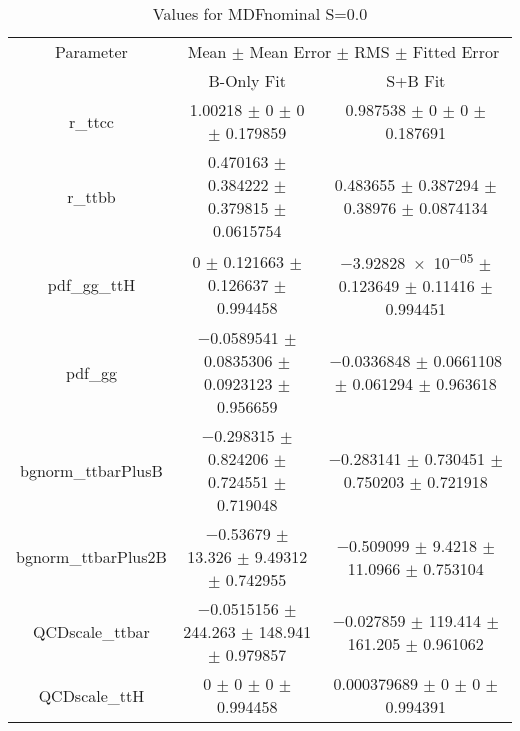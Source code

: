 \begin{table}
\centering
\caption{Values for MDFnominal S=0.0}
\begin{tabular}{ccc}
\toprule
Parameter & \multicolumn{2}{c}{Mean $\pm$ Mean Error $\pm$ RMS $\pm$ Fitted Error}\\
 & B-Only Fit & S+B Fit\\
\midrule
r\_ttcc & \num{1.00218} $\pm$ \num{0} $\pm$ \num{0} $\pm$ \num{0.179859} & \num{0.987538} $\pm$ \num{0} $\pm$ \num{0} $\pm$ \num{0.187691}\\
r\_ttbb & \num{0.470163} $\pm$ \num{0.384222} $\pm$ \num{0.379815} $\pm$ \num{0.0615754} & \num{0.483655} $\pm$ \num{0.387294} $\pm$ \num{0.38976} $\pm$ \num{0.0874134}\\
pdf\_gg\_ttH & \num{0} $\pm$ \num{0.121663} $\pm$ \num{0.126637} $\pm$ \num{0.994458} & \num{-3.92828e-05} $\pm$ \num{0.123649} $\pm$ \num{0.11416} $\pm$ \num{0.994451}\\
pdf\_gg & \num{-0.0589541} $\pm$ \num{0.0835306} $\pm$ \num{0.0923123} $\pm$ \num{0.956659} & \num{-0.0336848} $\pm$ \num{0.0661108} $\pm$ \num{0.061294} $\pm$ \num{0.963618}\\
bgnorm\_ttbarPlusB & \num{-0.298315} $\pm$ \num{0.824206} $\pm$ \num{0.724551} $\pm$ \num{0.719048} & \num{-0.283141} $\pm$ \num{0.730451} $\pm$ \num{0.750203} $\pm$ \num{0.721918}\\
bgnorm\_ttbarPlus2B & \num{-0.53679} $\pm$ \num{13.326} $\pm$ \num{9.49312} $\pm$ \num{0.742955} & \num{-0.509099} $\pm$ \num{9.4218} $\pm$ \num{11.0966} $\pm$ \num{0.753104}\\
QCDscale\_ttbar & \num{-0.0515156} $\pm$ \num{244.263} $\pm$ \num{148.941} $\pm$ \num{0.979857} & \num{-0.027859} $\pm$ \num{119.414} $\pm$ \num{161.205} $\pm$ \num{0.961062}\\
QCDscale\_ttH & \num{0} $\pm$ \num{0} $\pm$ \num{0} $\pm$ \num{0.994458} & \num{0.000379689} $\pm$ \num{0} $\pm$ \num{0} $\pm$ \num{0.994391}\\
\bottomrule
\end{tabular}
\end{table}